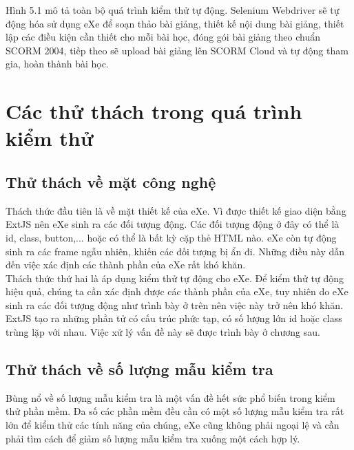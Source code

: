 Hình 5.1 mô tả toàn bộ quá trình kiểm thử tự động. Selenium Webdriver sẽ tự động hóa sử dụng eXe để soạn thảo bài giảng, thiết kế nội dung bài giảng, thiết lập các điều kiện cần thiết cho mỗi bài học, đóng gói bài giảng theo chuẩn SCORM 2004, tiếp theo sẽ upload bài giảng lên SCORM Cloud và tự động tham gia, hoàn thành bài học.
\newpage

\section{Các thử thách trong quá trình kiểm thử}
\subsection{Thử thách về mặt công nghệ}

Thách thức đầu tiên là về mặt thiết kế của eXe. Vì được thiết kế giao diện bằng ExtJS nên eXe sinh ra các đối tượng động. Các đối tượng động ở đây có thể là id, class, button,... hoặc có thể là bất kỳ cặp thẻ HTML nào. eXe còn tự động sinh ra các frame ngẫu nhiên, khiến các đối tượng bị ẩn đi. Những điều này dẫn đến việc xác định các thành phần của eXe rất khó khăn. \\

Thách thức thứ hai là áp dụng kiểm thử tự động cho eXe. Để kiểm thử tự động hiệu quả, chúng ta cần xác định được các thành phần của eXe, tuy nhiên do eXe sinh ra các đối tượng động như trình bày ở trên nên việc này trở nên khó khăn. ExtJS tạo ra những phần tử có cấu trúc phức tạp, có số lượng lớn id hoặc class trùng lặp với nhau. Việc xử lý vấn đề này sẽ được trình bày ở chương sau.\\


\subsection{Thử thách về số lượng mẫu kiểm tra}

Bùng nổ về số lượng mẫu kiểm tra là một vấn đề hết sức phổ biến trong kiểm thử phần mềm. Đa số các phần mềm đều cần có một số lượng mẫu kiểm tra rất lớn để kiểm thử các tính năng của chúng, eXe cũng không phải ngoại lệ và cần phải tìm cách để giảm số lượng mẫu kiểm tra xuống một cách hợp lý.


